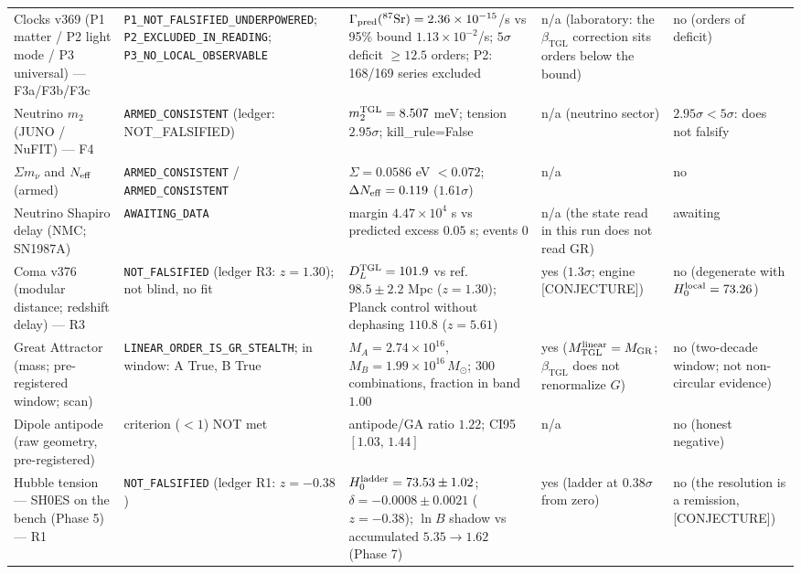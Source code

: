 \documentclass[11pt]{article}
\newcommand{\bTGL}{\beta_{\mathrm{TGL}}}\newcommand{\Msun}{M_{\odot}}\newcommand{\TGL}{\mathrm{TGL}}
\theoremstyle{definition}\newtheorem{deriv}{Derivation}
\begin{document}
\begin{footnotesize}
\begin{longtable}{@{}p{}p{}p{}p{}p{}@{}}
Clocks v369 (P1 matter / P2 light mode / P3 universal) --- F3a/F3b/F3c & \texttt{P1\_\allowbreak{}NOT\_\allowbreak{}FALSIFIED\_\allowbreak{}UNDERPOWERED}; \texttt{P2\_\allowbreak{}EXCLUDED\_\allowbreak{}IN\_\allowbreak{}READING}; \texttt{P3\_\allowbreak{}NO\_\allowbreak{}LOCAL\_\allowbreak{}OBSERVABLE} & $\Gamma_{\rm pred}(^{87}\mathrm{Sr})=2.36\times10^{-15}$/s vs 95\% bound $1.13\times10^{-2}$/s; $5\sigma$ deficit $\geq12.5$ orders; P2: 168/169 series excluded & n/a (laboratory: the $\bTGL$ correction sits orders below the bound) & no (orders of deficit) \\
Neutrino $m_2$ (JUNO / NuFIT) --- F4 & \texttt{ARMED\_\allowbreak{}CONSISTENT} (ledger: NOT\_FALSIFIED) & $m_2^{\rm TGL}=8.507$ meV; tension $2.95\sigma$; kill\_rule=False & n/a (neutrino sector) & $2.95\sigma<5\sigma$: does not falsify \\
$\Sigma m_\nu$ and $N_{\rm eff}$ (armed) & \texttt{ARMED\_\allowbreak{}CONSISTENT} / \texttt{ARMED\_\allowbreak{}CONSISTENT} & $\Sigma=0.0586$ eV $<0.072$; $\Delta N_{\rm eff}=0.119$ ($1.61\sigma$) & n/a & no \\
Neutrino Shapiro delay (NMC; SN1987A) & \texttt{AWAITING\_\allowbreak{}DATA} & margin $4.47\times10^{4}$ s vs predicted excess $0.05$ s; events 0 & n/a (the state read in this run does not read GR) & awaiting \\
Coma v376 (modular distance; redshift delay) --- R3 & \texttt{NOT\_\allowbreak{}FALSIFIED} (ledger R3: $z=1.30$); not blind, no fit & $D_L^{\rm TGL}=101.9$ vs ref.\ $98.5\pm2.2$ Mpc ($z=1.30$); Planck control without dephasing $110.8$ ($z=5.61$) & yes ($1.3\sigma$; engine \textsf{[CONJECTURE]}) & no (degenerate with $H_0^{\rm local}=73.26$) \\
Great Attractor (mass; pre-registered window; scan) & \texttt{LINEAR\_\allowbreak{}ORDER\_\allowbreak{}IS\_\allowbreak{}GR\_\allowbreak{}STEALTH}; in window: A True, B True & $M_A=2.74\times10^{16}$, $M_B=1.99\times10^{16}\,M_\odot$; 300 combinations, fraction in band $1.00$ & yes ($M^{\rm linear}_{\rm TGL}=M_{\rm GR}$; $\bTGL$ does not renormalize $G$) & no (two-decade window; not non-circular evidence) \\
Dipole antipode (raw geometry, pre-registered) & criterion ($<1$) NOT met & antipode/GA ratio $1.22$; CI95 $[1.03,\,1.44]$ & n/a & no (honest negative) \\
Hubble tension --- SH0ES on the bench (Phase 5) --- R1 & \texttt{NOT\_\allowbreak{}FALSIFIED} (ledger R1: $z=-0.38$) & $H_0^{\rm ladder}=73.53\pm1.02$; $\delta=-0.0008\pm0.0021$ ($z=-0.38$); $\ln B$ shadow vs accumulated $5.35\to1.62$ (Phase 7) & yes (ladder at $0.38\sigma$ from zero) & no (the resolution is a remission, \textsf{[CONJECTURE]}) \\

\end{longtable}
\end{footnotesize}
\end{document}
